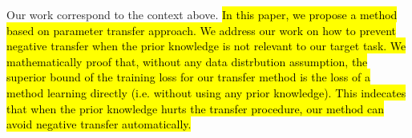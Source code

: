 Our work correspond to the context above. \hl{In this paper, we propose a method based on parameter transfer approach. We address our work on how to prevent negative transfer when the prior knowledge is not relevant to our target task. We mathematically proof that, without any data distrbution assumption, the superior bound of the training loss for our transfer method is the loss of a method learning directly (i.e. without using any prior knowledge). This indecates that when the prior knowledge hurts the transfer procedure, our method can avoid negative transfer automatically.} 
